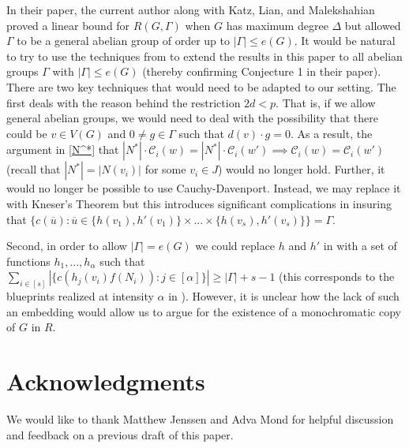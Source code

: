 \documentclass{article}
\newcommand{\cC}{\mathcal{C} }
\theoremstyle{definition}
\begin{document}
In their paper, the current author along with Katz, Lian, and Malekshahian \cite{bounded_degree} proved a linear bound for $R(G,\Gamma)$ when $G$ has maximum degree $\Delta$ but allowed $\Gamma$ to be a general abelian group of order up to $|\Gamma|\leq e(G)$.
It would be natural to try to use the techniques from \cite{bounded_degree} to extend the results in this paper to all abelian groups $\Gamma$ with $|\Gamma|\leq e(G)$ (thereby confirming Conjecture 1 in their paper). There are two key techniques that would need to be adapted to our setting. The first deals with the reason behind the restriction $2d<p$. That is, if we allow general abelian groups, we would need to deal with the possibility that there could be $v\in V(G)$ and $0\neq g\in \Gamma$ such that $d(v)\cdot g =0$. As a result, the argument in \cref{N^*} that $|N^*|\cdot \cC_i(w)=|N^*|\cdot \cC_i(w') \implies \cC_i(w)=\cC_i(w')$ (recall that $|N^*|=|N(v_i)|$ for some $v_i\in J$) would no longer hold. Further, it would no longer be possible to use Cauchy-Davenport. Instead, we may replace it with Kneser’s Theorem \cite{Kneser_1953} but this introduces significant complications in insuring that $\{c(\overline{u}):\overline{u}\in \{h(v_1),h'(v_1)\}\times...\times \{h(v_s),h'(v_s)\}\}=\Gamma$. 

Second, in order to allow $|\Gamma|=e(G)$ we could replace $h$ and $h'$ in  with a set of functions $h_1,...,h_\alpha$ such that $\sum_{i\in [s]}|\{c(h_j(v_i)f(N_i)):j\in [\alpha]\}|\geq |\Gamma|+s-1$ (this corresponds to the blueprints realized at intensity $\alpha$ in \cite{bounded_degree}). However, it is unclear how the lack of such an embedding would allow us to argue for the existence of a monochromatic copy of $G$ in $R$.

\section*{Acknowledgments}
We would like to thank Matthew Jenssen and Adva Mond for helpful discussion and feedback on a previous draft of this paper.




\end{document}
